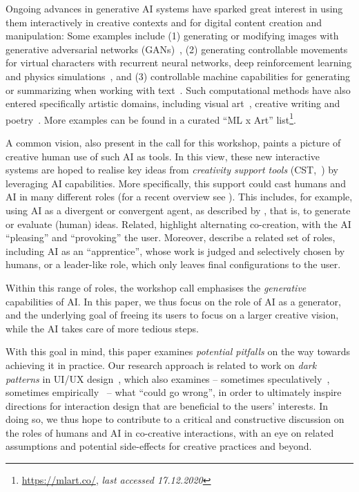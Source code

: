 \documentclass[
twocolumn,
]{ceurart}
\newcommand{\lastaccessed}{\textit{last accessed 17.12.2020}}
\begin{document}
Ongoing advances in generative AI systems have sparked great interest in using them interactively in creative contexts and for digital content creation and manipulation:
Some examples include (1) generating or modifying images with generative adversarial networks (GANs)~\cite{Bau2020,Harkonen2020,Karras2020}, (2) generating controllable movements for virtual characters with recurrent neural networks, deep reinforcement learning and physics simulations~\cite{Park2019}, and (3) controllable machine capabilities for generating or summarizing when working with text~\cite{Dathathri2020,Gehrmann2020}.
Such computational methods have also entered specifically artistic domains, including visual art~\cite{Akten2019}, creative writing and poetry~\cite{Gero2019, Ghazvininejad2017}. More examples can be found in a curated ``ML x Art'' list\footnote{\url{https://mlart.co/}, \lastaccessed}.

A common vision, also present in the call for this workshop, paints a picture of creative human use of such AI as tools. In this view, these new interactive systems are hoped to realise key ideas from \textit{creativity support tools} (CST,~\cite{Frich2019}) by leveraging AI capabilities. 
More specifically, this support could cast humans and AI in many different roles (for a recent overview see \cite{Kantosalo2020roleoverview}). This includes, for example, using AI as a divergent or convergent agent, as described by \citet{Hoffmann2016}, that is, to generate or evaluate (human) ideas. Related, \citet{Kantosalo2016} highlight alternating co-creation, with the AI ``pleasing'' and ``provoking'' the user. Moreover, \citet{NegreteYankelevich2014} describe a related set of roles, including AI as an ``apprentice'', whose work is judged and selectively chosen by humans, or a leader-like role, which only leaves final configurations to the user.

Within this range of roles, the workshop call emphasises the \textit{generative} capabilities of AI. In this paper, we thus focus on the role of AI as a generator, and the underlying goal of freeing its users to focus on a larger creative vision, while the AI takes care of more tedious steps.

With this goal in mind, this paper examines \textit{potential pitfalls} on the way towards achieving it in practice. 
Our research approach is related to work on \textit{dark patterns} in UI/UX design~\cite{Gray2018}, which also examines -- sometimes speculatively~\cite{Chromik2019}, sometimes empirically~\cite{DiGeronimo2020} -- what ``could go wrong'', in order to ultimately inspire directions for interaction design that are beneficial to the users' interests. 
In doing so, we thus hope to contribute to a critical and constructive discussion on the roles of humans and AI in co-creative interactions, with an eye on related assumptions and potential side-effects for creative practices and beyond. 
\end{document}

